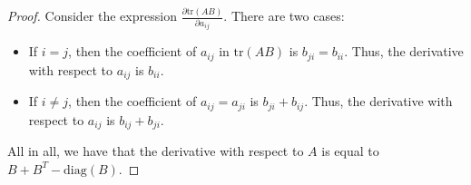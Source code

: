 \documentclass[10pt]{article}
\newcommand{\tr}{\mathrm{tr}}
\newcommand{\diag}{\mathrm{diag}}
\begin{document}
\begin{itemize}
\begin{proof}
      Consider the expression $\frac{\partial \tr(AB)}{\partial a_{ij}}$. There are two cases:
      \begin{itemize}
        \item If $i = j$, then the coefficient of $a_{ij}$ in $\tr(AB)$ is $b_{ji} = b_{ii}$. Thus, the derivative with respect to $a_{ij}$ is $b_{ii}$.
        
        \item If $i \neq j$, then the coefficient of $a_{ij} = a_{ji}$ is $b_{ji} + b_{ij}$. Thus, the derivative with respect to $a_{ij}$ is $b_{ij} + b_{ji}$.
      \end{itemize}
      All in all, we have that the derivative with respect to $A$ is equal to $B + B^T - \diag(B)$.
    \end{proof}    
  \end{itemize}
  

	
\end{document}
